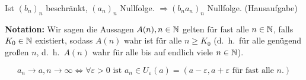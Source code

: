 \documentclass[../ana1.tex]{subfiles}
\begin{document}
\begin{bsp}
	Ist \( {(b_n)}_n \) beschränkt, \( {(a_n)}_n \) Nullfolge. \( \Rightarrow {(b_n a_n)}_n \) Nullfolge. (Hausaufgabe)
\end{bsp}

\textbf{Notation:} Wir sagen die Aussagen \( A(n), n\in\mathbb{N} \) gelten für fast alle \( n\in\mathbb{N} \), falls \( K_0\in\mathbb{N} \) existiert, sodass \(A(n)\) wahr ist für alle \( n\geq K_0 \) (d.\ h.\ für alle genügend großen \( n \), d.\ h.\  \( A(n) \) wahr für alle bis auf endlich viele \(n\in\mathbb{N} \)).

\begin{bsp}
	\[ a_n\rightarrow a,n\rightarrow\infty \Leftrightarrow \forall \varepsilon > 0 \text{ ist } a_n\in U_\varepsilon(a) = (a-\varepsilon, a+\varepsilon \text{ für fast alle } n.)  \]
\end{bsp}
\end{document}
